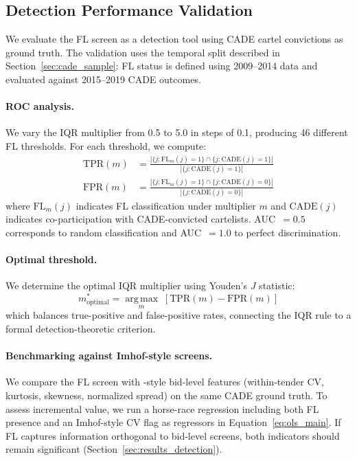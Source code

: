 
\subsection{Detection Performance Validation}
\label{sec:detection_validation}

We evaluate the FL screen as a detection tool using CADE cartel
convictions as ground truth. The validation uses the temporal split
described in Section~\ref{sec:cade_sample}: FL status is defined using
2009--2014 data and evaluated against 2015--2019 CADE outcomes.

\paragraph{ROC analysis.}
We vary the IQR multiplier from 0.5 to 5.0 in steps of 0.1, producing
46 different FL thresholds. For each threshold, we compute:
\begin{align}
  \text{TPR}(m) &= \frac{|\{j : \text{FL}_m(j)=1\} \cap
    \{j : \text{CADE}(j)=1\}|}{|\{j : \text{CADE}(j)=1\}|}
  \label{eq:tpr} \\
  \text{FPR}(m) &= \frac{|\{j : \text{FL}_m(j)=1\} \cap
    \{j : \text{CADE}(j)=0\}|}{|\{j : \text{CADE}(j)=0\}|}
  \label{eq:fpr}
\end{align}
where $\text{FL}_m(j)$ indicates FL classification under multiplier $m$
and $\text{CADE}(j)$ indicates co-participation with CADE-convicted
cartelists. AUC~$= 0.5$ corresponds to random classification and
AUC~$= 1.0$ to perfect discrimination.

\paragraph{Optimal threshold.}
We determine the optimal IQR multiplier using Youden's $J$
statistic:
\begin{equation}
  m^*_{\text{optimal}} = \operatorname*{arg\,max}_m \;
  \left[\text{TPR}(m) - \text{FPR}(m)\right]
  \label{eq:youden}
\end{equation}
which balances true-positive and false-positive rates, connecting the
IQR rule to a formal detection-theoretic criterion.

\paragraph{Benchmarking against Imhof-style screens.}
We compare the FL screen with \citet{imhof2019detecting}-style
bid-level features (within-tender CV, kurtosis, skewness, normalized
spread) on the same CADE ground truth. To assess incremental value,
we run a horse-race regression including both FL presence and an
Imhof-style CV flag as regressors in
Equation~\eqref{eq:ols_main}. If FL captures information orthogonal
to bid-level screens, both indicators should remain significant
(Section~\ref{sec:results_detection}).


